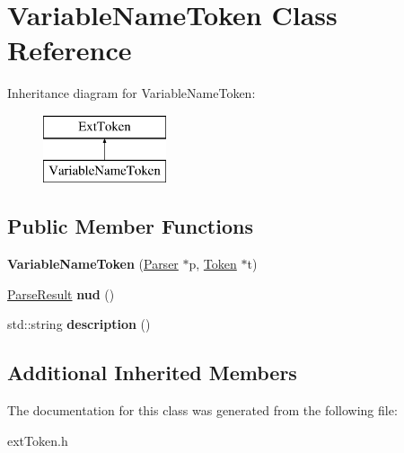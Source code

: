 \hypertarget{class_variable_name_token}{}\section{Variable\+Name\+Token Class Reference}
\label{class_variable_name_token}
Inheritance diagram for Variable\+Name\+Token\+:\begin{figure}[H]
\begin{center}
\leavevmode
\includegraphics[height=2.000000cm]{class_variable_name_token}
\end{center}
\end{figure}
\subsection*{Public Member Functions}
\begin{DoxyCompactItemize}
\item 
\hypertarget{class_variable_name_token_a804403db425122d1c8d40fd2c6172439}{}{\bfseries Variable\+Name\+Token} (\hyperlink{class_parser}{Parser} $\ast$p, \hyperlink{class_token}{Token} $\ast$t)\label{class_variable_name_token_a804403db425122d1c8d40fd2c6172439}

\item 
\hypertarget{class_variable_name_token_a6e775ad5b8c2eafd2e2a185ab90b1f27}{}\hyperlink{class_parse_result}{Parse\+Result} {\bfseries nud} ()\label{class_variable_name_token_a6e775ad5b8c2eafd2e2a185ab90b1f27}

\item 
\hypertarget{class_variable_name_token_a54bc3a78736e5c967dc4b1c58e66135b}{}std\+::string {\bfseries description} ()\label{class_variable_name_token_a54bc3a78736e5c967dc4b1c58e66135b}

\end{DoxyCompactItemize}
\subsection*{Additional Inherited Members}


The documentation for this class was generated from the following file\+:\begin{DoxyCompactItemize}
\item 
ext\+Token.\+h\end{DoxyCompactItemize}
